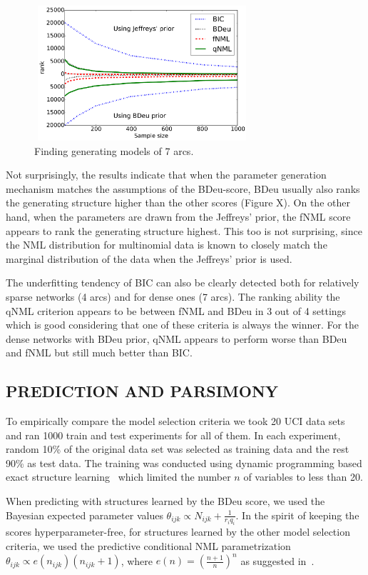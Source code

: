 \begin{figure}[h]
\centering
\includegraphics[width=8cm,height=5cm]{qNML_images/art7_mean.pdf}
\caption{Finding generating models of 7 arcs.}
\label{fig:4arcs}
\end{figure}


Not surprisingly, the results indicate that when the parameter generation
mechanism matches the assumptions of the BDeu-score, BDeu usually
also ranks the generating structure higher than the other scores
(Figure X).  On the other hand, when the parameters are drawn from the
Jeffreys' prior, the fNML score appears to rank the generating structure
highest. This too is not surprising, since the NML distribution for
multinomial data is known to closely match the marginal distribution of
the data when the Jeffreys' prior is used.

The underfitting tendency of BIC can also be clearly detected both for
relatively sparse networks (4 arcs) and for dense ones (7 arcs). The
ranking ability the qNML criterion appears to be between fNML and BDeu
in 3 out of 4 settings which is good considering that one of these
criteria is always the winner. For the dense networks with BDeu prior,
qNML appears to perform worse than BDeu and fNML but still much
better than BIC.

\subsection{PREDICTION AND PARSIMONY}

To empirically compare the model selection criteria we took 20 UCI
data sets~\cite{Lichman:2013} and ran 1000 train and test experiments
for all of them. In each experiment, random 10\% of the original
data set was selected as training data and the rest 90\% as test data.
The training was conducted using dynamic programming based exact structure
learning~\cite{cosco.uai06} which limited the number $n$ of variables
to less than 20.

When predicting with structures learned by the BDeu score, we used the
Bayesian expected parameter values $\theta_{ijk} \propto
N_{ijk}+\frac{1}{r_iq_i}$.  In the spirit of keeping the scores
hyperparameter-free, for structures learned by the other model
selection criteria, we used the predictive conditional NML
parametrization $\theta_{ijk}\propto e(n_{ijk})(n_{ijk}+1)$, where
$e(n)=(\frac{n+1}{n})^n$ as suggested in~\cite{Riss07b}.

